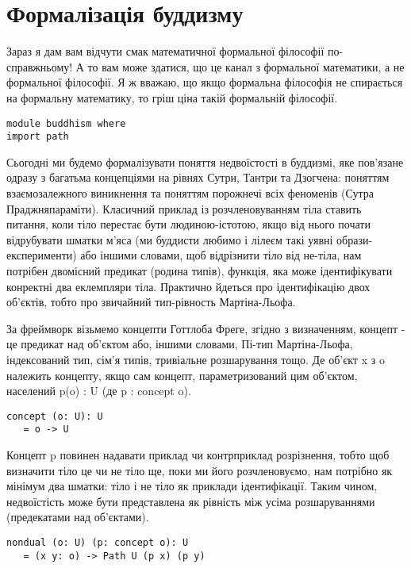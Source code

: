 \section{Формалізація буддизму}

Зараз я дам вам відчути смак математичної формальної філософії по-справжньому!
А то вам може здатися, що це канал з формальної математики, а не
формальної філософії. Я ж вважаю, що якщо формальна філософія не
спирається на формальну математику, то гріш ціна такій формальній філософії.

\begin{lstlisting}
module buddhism where
import path
\end{lstlisting}

Сьогодні ми будемо формалізувати поняття недвоїстості в буддизмі,
яке пов'язане одразу з багатьма концепціями на рівнях Сутри, Тантри
та Дзогчена: поняттям взаємозалежного виникнення та поняттям порожнечі
всіх феноменів (Сутра Праджняпараміти). Класичний приклад із
розчленовуванням тіла ставить питання, коли тіло перестає бути
людиною-істотою, якщо від нього почати відрубувати шматки м'яса (ми
буддисти любимо і лілеєм такі уявні образи-експерименти) або іншими
словами, щоб відрізнити тіло від не-тіла, нам потрібен двомісний
предикат (родина типів), функція, яка може ідентифікувати конректні
два еклемпляри тіла. Практично йдеться про ідентифікацію двох об'єктів,
тобто про звичайний тип-рівность Мартіна-Льофа.

За фреймворк візьмемо концепти Готтлоба Фреге, згідно з визначенням,
концепт - це предикат над об'єктом або, іншими словами, Пі-тип Мартіна-Льофа,
індексований тип, сім'я типів, тривіальне розшарування тощо. Де об'єкт x з o
належить концепту, якщо сам концепт, параметризований цим об'єктом,
населений p(o) : U (де p : concept o).

\begin{lstlisting}
concept (o: U): U
   = o -> U
\end{lstlisting}

Концепт p повинен надавати приклад чи контрприклад розрізнення,
тобто щоб визначити тіло це чи не тіло ще, поки ми його розчленовуємо,
нам потрібно як мінімум два шматки: тіло і не тіло як приклади ідентифікації.
Таким чином, недвоїстість може бути представлена як рівність між усіма
розшаруваннями (предекатами над об'єктами).

\begin{lstlisting}
nondual (o: U) (p: concept o): U
   = (x y: o) -> Path U (p x) (p y)
\end{lstlisting}

